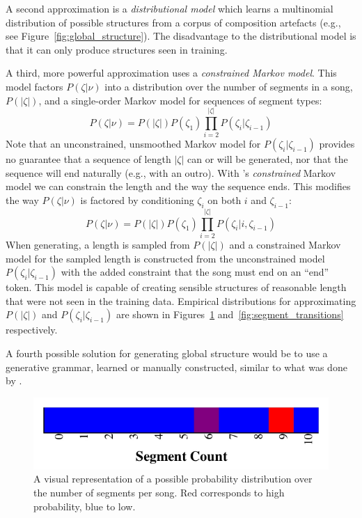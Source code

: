 \documentclass[phd,electronic,oneside,twosidetoc,letterpaper,chaptercenter,parttop,lof,lot]{byumsphd}
\begin{document}
A second approximation is a \textit{distributional model} which learns a multinomial distribution of possible structures from a corpus of composition artefacts (e.g., see Figure~\ref{fig:global_structure}). The disadvantage to the distributional model is that it can only produce structures seen in training. 

A third, more powerful approximation uses a \textit{constrained Markov model}. This model factors $P(\zeta|\nu)$ into a distribution over the number of segments in a song, $P(|\zeta|)$, and a single-order Markov model for sequences of segment types:
\[ P(\zeta|\nu) = P(|\zeta|) P(\zeta_1) \prod_{i=2}^{|\zeta|} P(\zeta_i|\zeta_{i-1}) \]
\noindent Note that an unconstrained, unsmoothed Markov model for $P(\zeta_i|\zeta_{i-1})$ provides no guarantee that a sequence of length $|\zeta|$ can or will be generated, nor that the sequence will end naturally (e.g., with an outro). With \citeauthor{pachet2011finite}'s \emph{constrained} Markov model we can constrain the length and the way the sequence ends. This modifies the way $P(\zeta|\nu)$ is factored by conditioning $\zeta_i$ on both $i$ and $\zeta_{i-1}$:
\[ P(\zeta|\nu) = P(|\zeta|) P(\zeta_1) \prod_{i=2}^{|\zeta|} P(\zeta_i|i,\zeta_{i-1}) \]
When generating, a length is sampled from $P(|\zeta|)$ and a constrained Markov model for the sampled length is constructed from the unconstrained model $P(\zeta_i|\zeta_{i-1})$ with the added constraint that the song must end on an ``end'' token. This model is capable of creating sensible structures of reasonable length that were not seen in the training data. Empirical distributions for approximating $P(|\zeta|)$ and $P(\zeta_i|\zeta_{i-1})$ are shown in Figures~\ref{fig:segment_count_per_song} and~\ref{fig:segment_transitions} respectively.

A fourth possible solution for generating global structure would be to use a generative grammar, learned or manually constructed, similar to what was done by \citeauthor{steedman1984generative} \cite{steedman1984generative}.

\begin{figure}
	\centering
	\includegraphics[width=.8\linewidth]{segment_count_per_song}
	\caption{\label{fig:segment_count_per_song} A visual representation of a possible probability distribution over the number of segments per song. Red corresponds to high probability, blue to low.}
\end{figure}
\end{document}

